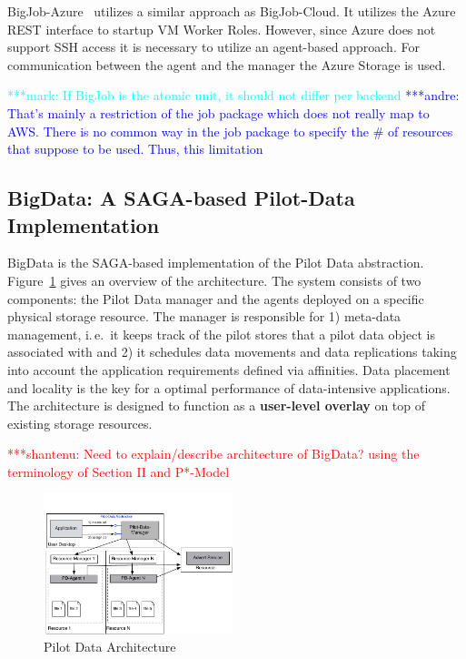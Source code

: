 \documentclass[conference,final]{IEEEtran}
\newcommand{\jhanote}[1]{ {\textcolor{red} { ***shantenu: #1 }}}
\newcommand{\alnote}[1]{ {\textcolor{blue} { ***andre: #1 }}}
\newcommand{\msnote}[1]{ {\textcolor{cyan} { ***mark: #1 }}}
\newcommand{\alnote}[1]{}
\newcommand{\jhanote}[1]{}
\newcommand{\msnote}[1]{}
\begin{document}
BigJob-Azure~\cite{10.1109/CloudCom.2010.85} utilizes a similar approach as
BigJob-Cloud. It utilizes the Azure REST interface to startup VM Worker Roles.
However, since Azure does not support SSH access it is necessary to utilize an
agent-based approach. For communication between the agent and the manager the
Azure Storage is used.

\msnote{If BigJob is the atomic unit, it should not differ per
  backend}\alnote{That's mainly a restriction of the job package which
  does not really map to AWS. There is no common way in the job
  package to specify the \# of resources that suppose to be
  used. Thus, this limitation}


\subsection{BigData: A SAGA-based Pilot-Data Implementation}
\label{sec:bigdata}

BigData is the SAGA-based implementation of the Pilot Data abstraction.
Figure~\ref{fig:figures_distributed_pilot_job} gives an overview of the
architecture. The system consists of two components: the Pilot Data manager and
the agents deployed on a specific physical storage resource. The manager is
responsible for 1) meta-data management, i.\,e.\ it keeps track of the pilot
stores that a pilot data object is associated with and 2) it schedules data
movements and data replications taking into account the application requirements 
defined via affinities. Data placement and locality is the key for a optimal 
performance of data-intensive applications. The architecture is designed to 
function as a \textbf{user-level overlay} on top of existing storage resources.


\jhanote{Need to explain/describe architecture of BigData? using the
  terminology of Section II and P*-Model}

\begin{figure}[htbp]
    \centering
        \includegraphics[width=0.49\textwidth]{figures/pilot-data-manager.pdf}
    \caption{Pilot Data Architecture}
    \label{fig:figures_distributed_pilot_job}
\end{figure}
\end{document}
